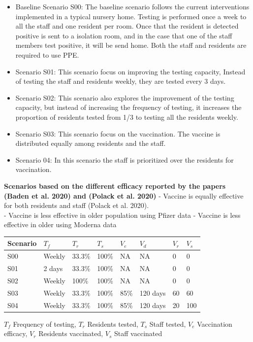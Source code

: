 \documentclass[
]{article}
\providecommand{\tightlist}{%
  \setlength{\itemsep}{0pt}\setlength{\parskip}{0pt}}
\begin{document}
\begin{itemize}
\tightlist
\item
  Baseline Scenario S00: The baseline scenario follows the current
  interventions implemented in a typical nursery home. Testing is
  performed once a week to all the staff and one resident per room. Once
  that the resident is detected positive is sent to a isolation room,
  and in the case that one of the staff members test positive, it will
  be send home. Both the staff and residents are required to use PPE.\\
\item
  Scenario S01: This scenario focus on improving the testing capacity,
  Instead of testing the staff and residents weekly, they are tested
  every 3 days.\\
\item
  Scenario S02: This scenario also explores the improvement of the
  testing capacity, but instead of increasing the frequency of testing,
  it increases the proportion of residents tested from 1/3 to testing
  all the residents weekly.\\
\item
  Scenario S03: This scenario focus on the vaccination. The vaccine is
  distributed equally among residents and the staff.
\item
  Scenario 04: In this scenario the staff is prioritized over the
  residents for vaccination.
\end{itemize}

\textbf{Scenarios based on the different efficacy reported by the papers
(Baden et al. 2020) and (Polack et al. 2020)} - Vaccine is equally
effective for both residents and staff (Polack et al. 2020).\\
- Vaccine is less effective in older population using Pfizer data -
Vaccine is less effective in older using Moderna data

\begin{longtable}[]{@{}llllllll@{}}
\toprule
Scenario & \(T_f\) & \(T_r\) & \(T_s\) & \(V_e\) & \(V_d\) & \(V_r\) &
\(V_s\)\tabularnewline
\midrule
\endhead
S00 & Weekly & 33.3\% & 100\% & NA & NA & 0 & 0\tabularnewline
S01 & 2 days & 33.3\% & 100\% & NA & NA & 0 & 0\tabularnewline
S02 & Weekly & 100\% & 100\% & NA & NA & 0 & 0\tabularnewline
S03 & Weekly & 33.3\% & 100\% & 85\% & 120 days & 60 & 60\tabularnewline
S04 & Weekly & 33.3\% & 100\% & 85\% & 120 days & 20 &
100\tabularnewline
\bottomrule
\end{longtable}

\(T_f\) Frequency of testing, \(T_r\) Residents tested, \(T_s\) Staff
tested, \(V_e\) Vaccination efficacy, \(V_r\) Residents vaccinated,
\(V_s\) Staff vaccinated
\end{document}
